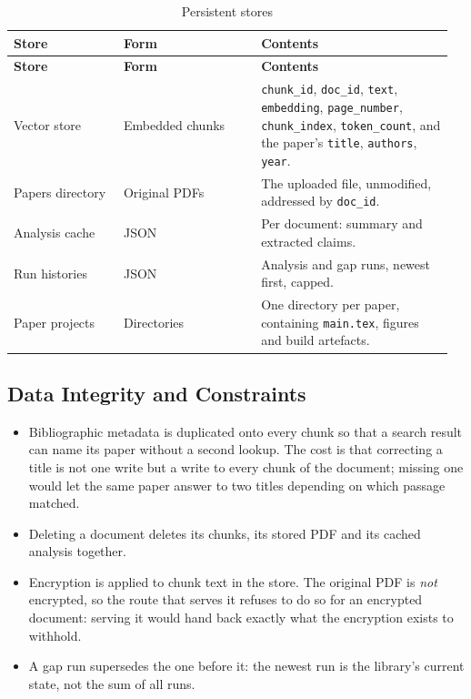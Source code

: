 \documentclass[12pt,a4paper]{report}
\begin{document}
\begin{longtable}{@{}p{0.24\linewidth}p{0.30\linewidth}p{0.42\linewidth}@{}}
\caption{Persistent stores}\label{tab:stores}\\
\toprule
\textbf{Store} & \textbf{Form} & \textbf{Contents} \\
\midrule
\endfirsthead
\toprule
\textbf{Store} & \textbf{Form} & \textbf{Contents} \\
\midrule
\endhead

Vector store & Embedded chunks & \texttt{chunk\_id}, \texttt{doc\_id},
  \texttt{text}, \texttt{embedding}, \texttt{page\_number},
  \texttt{chunk\_index}, \texttt{token\_count}, and the paper's
  \texttt{title}, \texttt{authors}, \texttt{year}. \\
\addlinespace
Papers directory & Original PDFs & The uploaded file, unmodified, addressed by
  \texttt{doc\_id}. \\
\addlinespace
Analysis cache & JSON & Per document: summary and extracted claims. \\
\addlinespace
Run histories & JSON & Analysis and gap runs, newest first, capped. \\
\addlinespace
Paper projects & Directories & One directory per paper, containing
  \texttt{main.tex}, figures and build artefacts. \\
\bottomrule
\end{longtable}

\subsection{Data Integrity and Constraints}

\begin{itemize}[leftmargin=*]
  \item Bibliographic metadata is duplicated onto every chunk so that a search
        result can name its paper without a second lookup. The cost is that
        correcting a title is not one write but a write to every chunk of the
        document; missing one would let the same paper answer to two titles
        depending on which passage matched.
  \item Deleting a document deletes its chunks, its stored PDF and its cached
        analysis together.
  \item Encryption is applied to chunk text in the store. The original PDF is
        \emph{not} encrypted, so the route that serves it refuses to do so for
        an encrypted document: serving it would hand back exactly what the
        encryption exists to withhold.
  \item A gap run supersedes the one before it: the newest run is the library's
        current state, not the sum of all runs.
\end{itemize}
\end{document}
